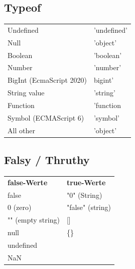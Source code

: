 \documentclass[a4paper, landscape, 8pt]{scrartcl}
\begin{document}
\begin{multicols*}{4}
        \subsection{Typeof}
        \begin{tabular}{l | l}
            Undefined & 'undefined' \\
            Null & 'object' \\
            Boolean & 'boolean' \\
            Number & 'number' \\
            BigInt (EcmaScript 2020) & bigint' \\
            String value & 'string' \\
            Function & 'function \\
            Symbol (ECMAScript 6) & 'symbol' \\
            All other & 'object'
        \end{tabular}

        \subsection{Falsy / Thruthy}
        \begin{tabular}{l | l}
            \textbf{false-Werte} & \textbf{true-Werte} \\
            false & "0" (String) \\
            0 (zero) & "false" (string) \\
            "" (empty string) & [] \\
            null & \{\} \\
            undefined & \\
            NaN &
        \end{tabular}


\end{multicols*}
\end{document}
